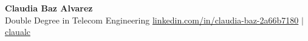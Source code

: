 \noindent\begin{flushleft}
    \textbf{\large\rmfamily Claudia Baz Alvarez} \\ \vspace{2pt}
    \large\rmfamily Double Degree in Telecom Engineering\hfill
    {\small\rmfamily
    \faLinkedin\hspace{4pt}\href{https://www.linkedin.com/in/claudia-baz-2a66b7180}{linkedin.com/in/claudia-baz-2a66b7180}
    \hspace{8pt}$|$\hspace{8pt}
    \faGithub\hspace{4pt}\href{https://github.com/claualc}{claualc}} \\ \vspace{1pt}
\end{flushleft}

